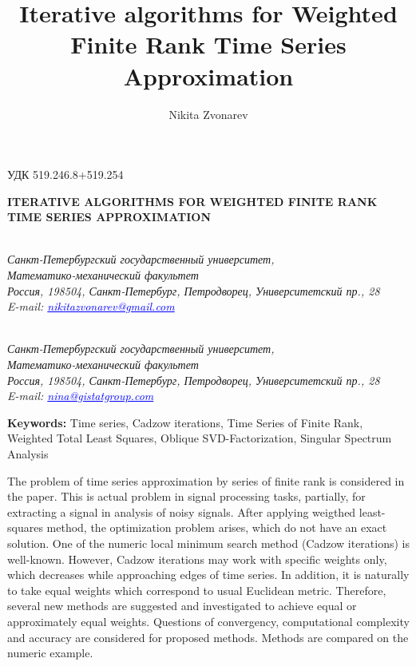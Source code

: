 \documentclass[12pt,a4paper,fleqn,leqno]{article}
\author{Nikita Zvonarev}
\title{Iterative algorithms for Weighted Finite Rank Time Series  Approximation}
\begin{document}
\noindent УДК 519.246.8+519.254

\begin{center}{
\fontsize{18pt}{23pt}\selectfont\bf%
  \MakeUppercase{
 Iterative algorithms for Weighted Finite Rank Time Series Approximation
}}
\end{center}

\begin{center}{\bpv{}\\
\footnotesize\it Санкт-Петербургский государственный университет,\\
Математико-механический факультет
\\
\rm
Россия, 198504, Санкт-Петербург, Петродворец, Университетский пр., 28\\
E-mail: \textcolor {blue}{\underline{nikitazvonarev@gmail.com}}}
\end{center}
\begin{center}{\\
\footnotesize\it Санкт-Петербургский государственный университет,\\
Математико-механический факультет
\\
\rm
Россия, 198504, Санкт-Петербург, Петродворец, Университетский пр., 28\\
E-mail: \textcolor {blue}{\underline{nina@gistatgroup.com}}}
\end{center}
\hspace{1.25cm}\begin{minipage}{12.16cm}\bpv\bpv\bmv \noindent
\footnotesize{\bf Keywords:}\/ Time series, Cadzow iterations, Time Series of Finite Rank, Weighted Total Least Squares, Oblique SVD-Factorization, Singular Spectrum Analysis

\bpv\bpv\noindent  The problem of time series approximation by series of finite rank is considered in the paper. This is actual problem in signal processing tasks, partially, for extracting a signal in analysis of noisy signals. After applying weigthed least-squares method, the optimization problem arises, which do not have an exact solution. One of the numeric local minimum search method (Cadzow iterations) is well-known. However, Cadzow iterations may work with specific weights only, which decreases while approaching edges of time series. In addition, it is naturally to take equal weights which correspond to usual Euclidean metric. Therefore, several new methods are suggested and investigated to achieve equal or approximately equal weights. Questions of convergency, computational complexity and accuracy are considered for proposed methods. Methods are compared on the numeric example.

\end{minipage}\bls\bmv
\end{document}
